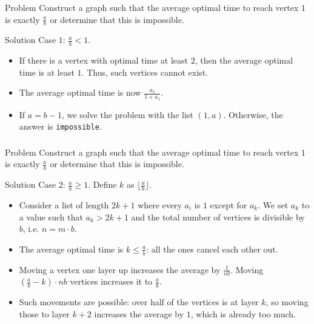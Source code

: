 \begin{frame}
    \frametitle{\problemtitle}
    \begin{block}{Problem}
        Construct a graph such that the average optimal time to reach vertex $1$
        is exactly $\displaystyle\frac{a}{b}$ or determine that this is impossible.
    \end{block}
    \begin{block}{Solution}
        Case $1$: $\frac{a}{b} < 1$.
        \begin{itemize}
            \item<+-> If there is a vertex with optimal time at least $2$, then
                the average optimal time is at least $1$.
                Thus, such vertices cannot exist.
            \item<+-> The average optimal time is now $\frac{a_1}{1+a_1}$.
            \item<+-> If $a = b-1$, we solve the problem with the list $(1,a)$. Otherwise, the answer is \texttt{impossible}.
        \end{itemize}
    \end{block}
\end{frame}
\begin{frame}
    \frametitle{\problemtitle}
    \begin{block}{Problem}
        Construct a graph such that the average optimal time to reach vertex $1$
        is exactly $\displaystyle\frac{a}{b}$ or determine that this is impossible.
    \end{block}
    \begin{block}{Solution}
        Case $2$: $\frac{a}{b} \geq 1$. Define $k$ as $\lfloor \frac{a}{b} \rfloor$.
        \begin{itemize}
            \item<+-> Consider a list of length $2k+1$ where every $a_i$ is $1$
                except for $a_k$. We set $a_k$ to a value such that $a_k > 2k+1$
                and the total number of vertices is divisible by $b$, i.e.
                $n=m\cdot b$.
            \item<+-> The average optimal time is $k\leq \frac ab$: all the ones cancel each other out.
            \item<+-> Moving a vertex one layer up increases the average by
                $\frac{1}{nb}$. Moving $(\frac ab - k)\cdot nb$ vertices increases it to $\frac{a}{b}$.
            \item<+-> Such movements are possible: over half of the vertices is at layer $k$, so moving those to layer $k+2$ increases the average by $1$, which is already too much.
        \end{itemize}
    \end{block}
    \solvestats
\end{frame}

